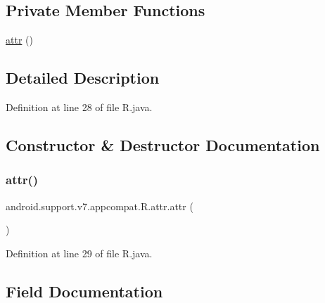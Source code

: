\subsection*{Private Member Functions}
\begin{DoxyCompactItemize}
\item 
\mbox{\hyperlink{classandroid_1_1support_1_1v7_1_1appcompat_1_1_r_1_1attr_a53df3eeb506dd17fd58e85434afbe54d}{attr}} ()
\end{DoxyCompactItemize}


\subsection{Detailed Description}


Definition at line 28 of file R.\+java.



\subsection{Constructor \& Destructor Documentation}
\mbox{\label{classandroid_1_1support_1_1v7_1_1appcompat_1_1_r_1_1attr_a53df3eeb506dd17fd58e85434afbe54d}} 
\subsubsection{\texorpdfstring{attr()}{attr()}}
{\footnotesize\ttfamily android.\+support.\+v7.\+appcompat.\+R.\+attr.\+attr (\begin{DoxyParamCaption}{ }\end{DoxyParamCaption})\hspace{0.3cm}{\ttfamily [private]}}



Definition at line 29 of file R.\+java.


\begin{DoxyCode}{0}

\end{DoxyCode}


\subsection{Field Documentation}
\mbox{\label{classandroid_1_1support_1_1v7_1_1appcompat_1_1_r_1_1attr_ac6a2c7ce44a2166d7e14504e8190c672}} 
